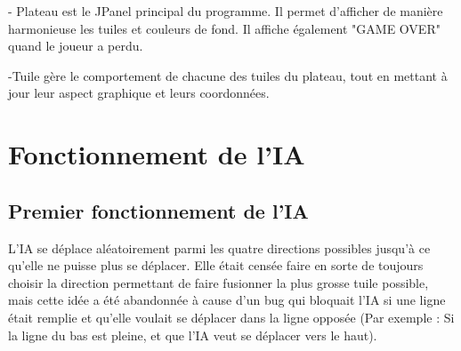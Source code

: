 \documentclass{report}
\begin{document}
- Plateau est le JPanel principal du programme. Il permet d'afficher de manière harmonieuse les tuiles et couleurs de fond. Il affiche également "GAME OVER" quand le joueur a perdu.

-Tuile gère le comportement de chacune des tuiles du plateau,  tout en mettant à jour leur aspect graphique et leurs coordonnées.

\chapter{Fonctionnement de l'IA}
\section{Premier fonctionnement de l'IA}
L'IA se déplace aléatoirement parmi les quatre directions possibles jusqu'à ce qu'elle ne puisse plus se déplacer. Elle était censée faire en sorte de toujours choisir la direction permettant de faire fusionner la plus grosse tuile possible, mais cette idée a été abandonnée à cause d'un bug qui bloquait l'IA si une ligne était remplie et qu'elle voulait se déplacer dans la ligne opposée (Par exemple : Si la ligne du bas est pleine, et que l'IA veut se déplacer vers le haut).
\end{document}

